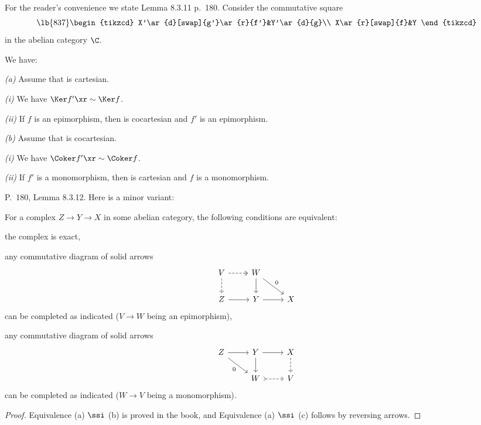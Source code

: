 \documentclass[12pt]{article}
\theoremstyle{remark}
\theoremstyle{definition}
\begin{document}
\begin{s} 
For the reader's convenience we state Lemma 8.3.11 p.~180. Consider the commutative square 
\begin{equation}\lb{837}
\begin{tikzcd}
X'\ar{d}[swap]{g'}\ar{r}{f'}&Y'\ar{d}{g}\\ 
X\ar{r}[swap]{f}&Y
\end{tikzcd}
\end{equation} 
in the abelian category $\C$. 

\begin{lem}[Lemma 8.3.11 p.~180]
We have:

\nn\emph{(a)} Assume that  is cartesian. 

\emph{(i)} We have $\Ker f'\xr\sim\Ker f$. 

\emph{(ii)} If $f$ is an epimorphism, then  is cocartesian and $f'$ is an epimorphism.

\nn\emph{(b)} Assume that  is cocartesian.

\emph{(i)} We have $\Coker f'\xr\sim\Coker f$.

\emph{(ii)} If $f'$ is a monomorphism, then  is cartesian and $f$ is a
monomorphism.
\end{lem}
\end{s} 

%

\begin{s}
P.~180, Lemma 8.3.12. Here is a minor variant:

\begin{lem}
For a complex $Z\to Y\to X$ in some abelian category, the following conditions are equivalent:

 the complex is exact,

 any commutative diagram of solid arrows
$$
\begin{tikzcd}
V\ar[dashed]{d}\ar[dashed, two heads]{r}&W\ar{dr}{0}\ar{d}\\ 
Z\ar{r}&Y\ar{r}&X
\end{tikzcd}
$$ 
can be completed as indicated ($V\to W$ being an epimorphism),

 any commutative diagram of solid arrows
$$
\begin{tikzcd}
Z\ar{dr}[swap]{0}\ar{r}&Y\ar{d}\ar{r}&X\ar[dashed]{d}\\ 
{}&W\ar[tail,dashed]{r}&V
\end{tikzcd}
$$ 
can be completed as indicated ($W\to V$ being a monomorphism).
\end{lem}

\begin{proof}
Equivalence (a) $\ssi$ (b) is proved in the book, and Equivalence (a) $\ssi$ (c) follows by reversing arrows.
\end{proof}
\end{s}
\end{document}
